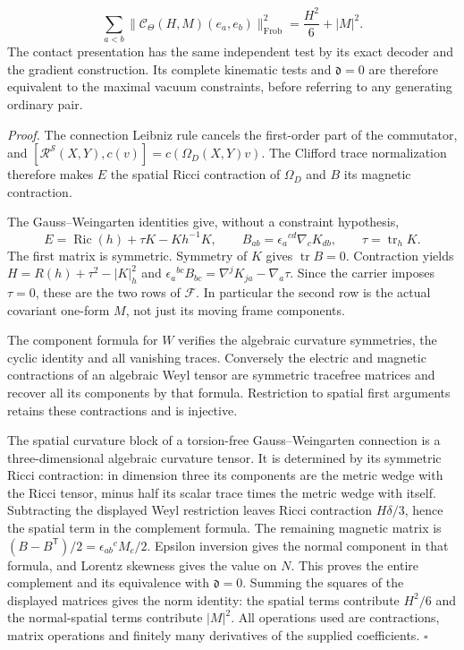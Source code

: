 \documentclass[
  english,
  11pt,
  reqno]{amsart}
\begin{document}
\label{eq:online-source-four-defect-norm} \[
\sum_{a<b}\|\mathcal C_\Theta(H,M)(e_a,e_b)\|_{\mathrm{Frob}}^2
=\frac{H^2}{6}+|M|^2.
\] The contact presentation has the same independent test by its exact
decoder and the gradient construction. Its complete kinematic tests and
\(\mathfrak d=0\) are therefore equivalent to the maximal vacuum
constraints, before referring to any generating ordinary pair.

\emph{Proof.} The connection Leibniz rule cancels the first-order part
of the commutator, and
\([\mathcal R^{\mathscr S}(X,Y),c(v)]=c(\Omega_D(X,Y)v)\). The Clifford
trace normalization therefore makes \(E\) the spatial Ricci contraction
of \(\Omega_D\) and \(B\) its magnetic contraction.

The Gauss--Weingarten identities give, without a constraint hypothesis,
\[
E=\operatorname{Ric}(h)+\tau K-Kh^{-1}K,
\qquad B_{ab}=\epsilon_a{}^{cd}\nabla_cK_{db},
\qquad \tau=\operatorname{tr}_hK.
\] The first matrix is symmetric. Symmetry of \(K\) gives
\(\operatorname{tr}B=0\). Contraction yields \(H=R(h)+\tau^2-|K|_h^2\)
and \(\epsilon_a{}^{bc}B_{bc}=\nabla^jK_{ja}-\nabla_a\tau\). Since the
carrier imposes \(\tau=0\), these are the two rows of \(\mathcal F\). In
particular the second row is the actual covariant one-form \(M\), not
just its moving frame components.

The component formula for \(W\) verifies the algebraic curvature
symmetries, the cyclic identity and all vanishing traces. Conversely the
electric and magnetic contractions of an algebraic Weyl tensor are
symmetric tracefree matrices and recover all its components by that
formula. Restriction to spatial first arguments retains these
contractions and is injective.

The spatial curvature block of a torsion-free Gauss--Weingarten
connection is a three-dimensional algebraic curvature tensor. It is
determined by its symmetric Ricci contraction: in dimension three its
components are the metric wedge with the Ricci tensor, minus half its
scalar trace times the metric wedge with itself. Subtracting the
displayed Weyl restriction leaves Ricci contraction \(H\delta/3\), hence
the spatial term in the complement formula. The remaining magnetic
matrix is \((B-B^{\mathsf T})/2=\epsilon_{ab}{}^cM_c/2\). Epsilon
inversion gives the normal component in that formula, and Lorentz
skewness gives the value on \(N\). This proves the entire complement and
its equivalence with \(\mathfrak d=0\). Summing the squares of the
displayed matrices gives the norm identity: the spatial terms contribute
\(H^2/6\) and the normal-spatial terms contribute \(|M|^2\). All
operations used are contractions, matrix operations and finitely many
derivatives of the supplied coefficients. \hfill\(\square\)
\end{document}
